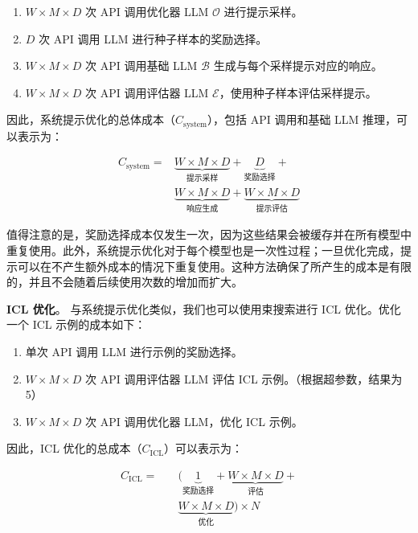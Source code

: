     \begin{enumerate}
        \item  $W \times M \times D$ 次 API 调用优化器 LLM $\mathcal{O}$ 进行提示采样。
        \item $D$ 次 API 调用 LLM 进行种子样本的奖励选择。
        \item $W \times M \times D$ 次 API 调用基础 LLM $\mathcal{B}$ 生成与每个采样提示对应的响应。
        \item $W \times M \times D$ 次 API 调用评估器 LLM $\mathcal{E}$，使用种子样本评估采样提示。
    \end{enumerate}

因此，系统提示优化的总体成本（$C_{\text{system}}$），包括 API 调用和基础 LLM 推理，可以表示为：

\begin{align*}
    C_{\text{system}} = & \underbrace{W \times M \times D}_{\text{提示采样}}
    + \underbrace{D}_{\text{奖励选择}} + \\
    & \underbrace{W \times M \times D}_{\text{响应生成}}
    + \underbrace{W \times M \times D}_{\text{提示评估}}
\end{align*}

值得注意的是，奖励选择成本仅发生一次，因为这些结果会被缓存并在所有模型中重复使用。此外，系统提示优化对于每个模型也是一次性过程；一旦优化完成，提示可以在不产生额外成本的情况下重复使用。这种方法确保了所产生的成本是有限的，并且不会随着后续使用次数的增加而扩大。

\noindent \textbf{ICL 优化}。
与系统提示优化类似，我们也可以使用束搜索进行 ICL 优化。优化一个 ICL 示例的成本如下：

    \begin{enumerate}
        \item 单次 API 调用 LLM 进行示例的奖励选择。
        \item $W \times M \times D$ 次 API 调用评估器 LLM 评估 ICL 示例。（根据超参数，结果为 5）
        \item $W \times M \times D$ 次 API 调用优化器 LLM，优化 ICL 示例。
    \end{enumerate}

因此，ICL 优化的总成本（$C_{\text{ICL}}$）可以表示为：

\begin{align*}
    C_{\text{ICL}} = \quad & (\underbrace{1}_{\text{奖励选择}} + \underbrace{W \times M \times D}_{\text{评估}} + \\
    & \underbrace{W \times M \times D}_{\text{优化}} ) \times N
\end{align*}

